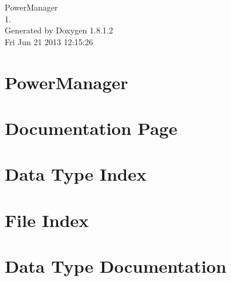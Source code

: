 \documentclass{book}
\begin{document}
\hypersetup{pageanchor=false,citecolor=blue}
\begin{titlepage}
\vspace*{7cm}
\begin{center}
{\Large Power\-Manager \\[1ex]\large 1. }\\
\vspace*{1cm}
{\large Generated by Doxygen 1.8.1.2}\\
\vspace*{0.5cm}
{\small Fri Jun 21 2013 12:15:26}\\
\end{center}
\end{titlepage}
\clearemptydoublepage
{}
\tableofcontents
\clearemptydoublepage
{}
\hypersetup{pageanchor=true,citecolor=blue}
\chapter{Power\-Manager}
\label{index}\hypertarget{index}{}
\chapter{Documentation Page}
\label{A}
\hypertarget{A}{}

\chapter{Data Type Index}

\chapter{File Index}

\chapter{Data Type Documentation}







































\end{document}

